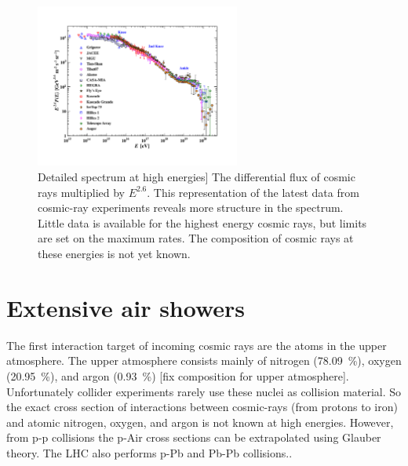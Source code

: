 \begin{figure}
    \centering
    \includegraphics[width=0.6\textwidth]
                    {plots/cosmic-rays/PDG_28_8_all_particle_spectrum}
    \caption{Detailed spectrum at high energies]
The differential flux of cosmic rays multiplied by $E^{2.6}$. This representation of the latest data from cosmic-ray experiments reveals more structure in the spectrum. Little data is available for the highest energy cosmic rays, but limits are set on the maximum rates. The composition of cosmic rays at these energies is not yet known.}
    \label{fig:PDG_28_8_all_particle_spectrum}
\end{figure}


\section{Extensive air showers}
\label{sec:cr:eas}

The first interaction target of incoming cosmic rays are the atoms in the upper atmosphere. The upper atmosphere consists mainly of nitrogen (\SI{78.09}{\percent}), oxygen (\SI{20.95}{\percent}), and argon (\SI{0.93}{\percent}) [fix composition for upper atmosphere]. Unfortunately collider experiments rarely use these nuclei as collision material. So the exact cross section of interactions between cosmic-rays (from protons to iron) and atomic nitrogen, oxygen, and argon is not known at high energies. However, from p-p collisions the p-Air cross sections can be extrapolated using Glauber theory. The LHC also performs p-Pb and Pb-Pb collisions..


